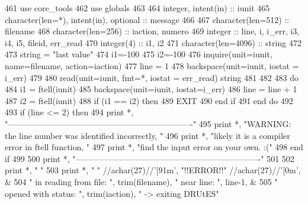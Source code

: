 \begin{DoxyCode}
461       \textcolor{keywordtype}{use }core_tools
462       \textcolor{keywordtype}{use }globals
463 
464       \textcolor{keywordtype}{integer}, \textcolor{keywordtype}{intent(in)} :: iunit
465       \textcolor{keywordtype}{character(len=*)}, \textcolor{keywordtype}{intent(in)}, \textcolor{keywordtype}{optional} :: message
466 
467       \textcolor{keywordtype}{character(len=512)} :: filename
468       \textcolor{keywordtype}{character(len=256)} :: iaction, numero
469       \textcolor{keywordtype}{integer} :: line, i, i\_err, i3, i4, i5, fileid, err\_read
470       \textcolor{keywordtype}{integer(4)} :: i1, i2
471       \textcolor{keywordtype}{character(len=4096)} :: string 
472 
473       string = \textcolor{stringliteral}{"last value"}
474       i1=-100
475       i2=-100
476       \textcolor{keyword}{inquire}(unit=iunit, name=filename, action=iaction) 
477       line = 1
478       backspace(unit=iunit, iostat = i\_err)
479 
480       \textcolor{keyword}{read}(unit=iunit, fmt=*, iostat = err\_read) string
481       
482       
483       \textcolor{keywordflow}{do}
484         i1 = ftell(iunit)
485         backspace(unit=iunit, iostat=i\_err)
486         line = line + 1
487         i2 = ftell(iunit)
488         \textcolor{keywordflow}{if} (i1 == i2) \textcolor{keywordflow}{then}
489           \textcolor{keywordflow}{EXIT}
490 \textcolor{keywordflow}{        end if}
491 \textcolor{keywordflow}{      end do}
492 
493       \textcolor{keywordflow}{if} (line <= 2) \textcolor{keywordflow}{then}
494         print *, \textcolor{stringliteral}{"-------------------------------------------------------------------"}
495         print *, \textcolor{stringliteral}{"WARNING: the line number was identified incorrectly, "}
496         print *, \textcolor{stringliteral}{"likely it is a compiler error in ftell function, "}
497         print *, \textcolor{stringliteral}{"find the input error on your own. :("}
498 \textcolor{keywordflow}{      end if}
499 
500       print *, \textcolor{stringliteral}{"-------------------------------------------------------------------"}
501 
502       print *, \textcolor{stringliteral}{"  "}
503       print *, \textcolor{stringliteral}{" "} //achar(27)//\textcolor{stringliteral}{'[91m'}, \textcolor{stringliteral}{"!!ERROR!!"} //achar(27)//\textcolor{stringliteral}{'[0m'}, \textcolor{comment}{&}
504 \textcolor{comment}{                  }\textcolor{stringliteral}{"  in reading from file: "}, trim(filename), \textcolor{stringliteral}{" near line: "}\textcolor{comment}{, line-1, &}
505 \textcolor{comment}{                      }\textcolor{stringliteral}{" opened with status: "}, trim(iaction),  \textcolor{stringliteral}{" -> exiting DRUtES"}

\end{DoxyCode}
